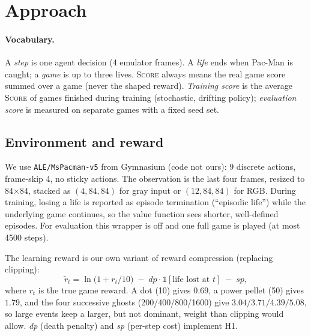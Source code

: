 \documentclass[11pt]{article}
\newcommand{\dpen}{\textit{dp}}
\newcommand{\spen}{\textit{sp}}
\newcommand{\score}{\textsc{Score}}
\begin{document}
\section{Approach}
\label{sec:approach}
\paragraph{Vocabulary.} A \emph{step} is one agent decision (4 emulator frames). A \emph{life} ends when Pac-Man is caught; a \emph{game} is up to three lives. \score{} always means the real game score summed over a game (never the shaped reward). \emph{Training score} is the average \score{} of games finished during training (stochastic, drifting policy); \emph{evaluation score} is measured on separate games with a fixed seed set.

\subsection{Environment and reward}
We use \texttt{ALE/MsPacman-v5} from Gymnasium \citep{towers2023gymnasium} (code not ours): 9 discrete actions, frame-skip 4, no sticky actions. The observation is the last four frames, resized to 84$\times$84, stacked as $(4,84,84)$ for gray input or $(12,84,84)$ for RGB. During training, losing a life is reported as episode termination (``episodic life'') while the underlying game continues, so the value function sees shorter, well-defined episodes. For evaluation this wrapper is off and one full game is played (at most 4500 steps).

The learning reward is our own variant of reward compression (replacing clipping):
\begin{equation}
  \tilde r_t = \ln\!\bigl(1 + r_t/10\bigr) \;-\; \dpen\cdot \mathbb 1[\text{life lost at } t] \;-\; \spen,
  \label{eq:reward}
\end{equation}
where $r_t$ is the true game reward. A dot (10) gives $0.69$, a power pellet (50) gives $1.79$, and the four successive ghosts (200/400/800/1600) give $3.04/3.71/4.39/5.08$, so large events keep a larger, but not dominant, weight than clipping would allow. \dpen{} (death penalty) and \spen{} (per-step cost) implement H1.
\end{document}

